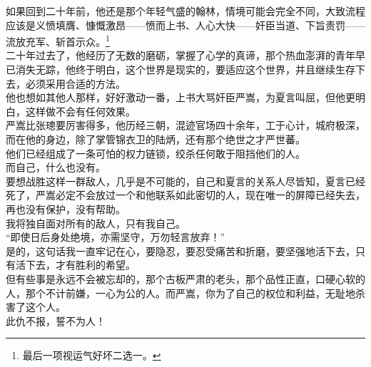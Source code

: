 \begin{multicols}{\theparacolNo}
如果回到二十年前，他还是那个年轻气盛的翰林，情境可能会完全不同，大致流程应该是义愤填膺、慷慨激昂——愤而上书、人心大快——奸臣当道、下旨责罚——流放充军、斩首示众。\footnote{最后一项视运气好坏二选一。}\\

二十年过去了，他经历了无数的磨砺，掌握了心学的真谛，那个热血澎湃的青年早已消失无踪，他终于明白，这个世界是现实的，要适应这个世界，并且继续生存下去，必须采用合适的方法。\\

他也想如其他人那样，好好激动一番，上书大骂奸臣严嵩，为夏言叫屈，但他更明白，这样做不会有任何效果。\\

严嵩比张璁要厉害得多，他历经三朝，混迹官场四十余年，工于心计，城府极深，而在他的身边，除了掌管锦衣卫的陆炳，还有那个绝世之才严世蕃。\\

他们已经组成了一条可怕的权力链锁，绞杀任何敢于阻挡他们的人。\\

而自己，什么也没有。\\

要想战胜这样一群敌人，几乎是不可能的，自己和夏言的关系人尽皆知，夏言已经死了，严嵩必定不会放过一个和他联系如此密切的人，现在唯一的屏障已经失去，再也没有保护，没有帮助。\\

我将独自面对所有的敌人，只有我自己。\\

“即使日后身处绝境，亦需坚守，万勿轻言放弃！”\\

是的，这句话我一直牢记在心，要隐忍，要忍受痛苦和折磨，要坚强地活下去，只有活下去，才有胜利的希望。\\

但有些事是永远不会被忘却的，那个古板严肃的老头，那个品性正直，口硬心软的人，那个不计前嫌，一心为公的人。而严嵩，你为了自己的权位和利益，无耻地杀害了这个人。\\

此仇不报，誓不为人！\\
\ifnum{}
	\end{multicols}
\fi
\newpage
